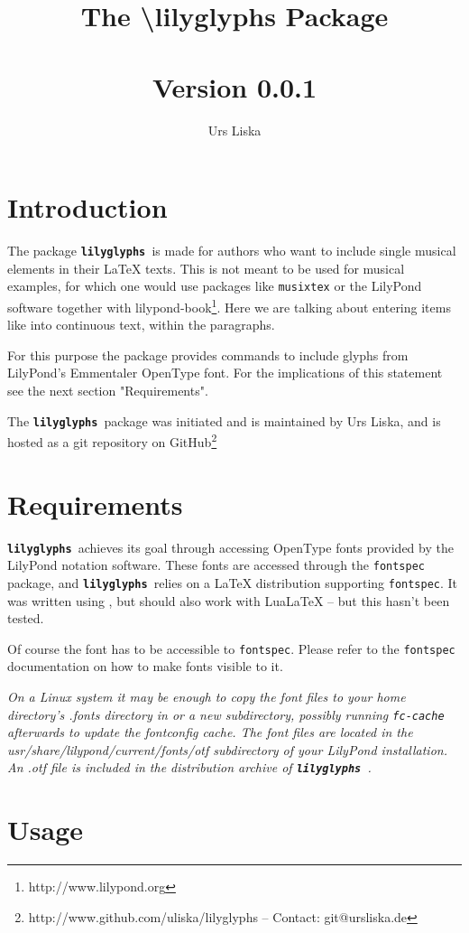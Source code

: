 \documentclass{article}
\title{The \textbackslash lilyglyphs Package\\~\\
	\normalsize Version 0.0.1}
\author{Urs Liska}
\newcommand{\lilyglyphs}{\texttt{\textbf{lilyglyphs }}}
\begin{document}
\maketitle
\tableofcontents
\section{Introduction}
The package \lilyglyphs is made for authors who want to include single musical elements in their \LaTeX{} texts. This is not meant to be used for musical examples, for which one would use packages like \texttt{musixtex} or the LilyPond software together with lilypond-book\footnote{http://www.lilypond.org}. Here we are talking about entering items like \lilyRFZ* into continuous text, within the paragraphs.

For this purpose the package provides commands to include glyphs from LilyPond's Emmentaler OpenType font. For the implications of this statement see the next section "Requirements".

The \lilyglyphs package was initiated and is maintained by Urs Liska, and is hosted as a git repository on GitHub\footnote{http://www.github.com/uliska/lilyglyphs -- Contact: git@ursliska.de}

\section{Requirements}
\lilyglyphs achieves its goal through accessing OpenType fonts provided by the LilyPond notation software. These fonts are accessed through the \texttt{fontspec} package, and \lilyglyphs relies on a \LaTeX{} distribution supporting \texttt{fontspec}. It was written using \XeLaTeX, but should also work with LuaLaTeX -- but this hasn't been tested.

Of course the font has to be accessible to \texttt{fontspec}. Please refer to the \texttt{fontspec} documentation on how to make fonts visible to it. 

\textit{On a Linux system it may be enough to copy the font files to your home directory's .fonts directory in or a new subdirectory, possibly running \texttt{fc-cache} afterwards to update the fontconfig cache. The font files are located in the usr/share/lilypond/current/fonts/otf subdirectory of your LilyPond installation. An .otf file is included in the distribution archive of \lilyglyphs.}



\section{Usage}
\end{document}
